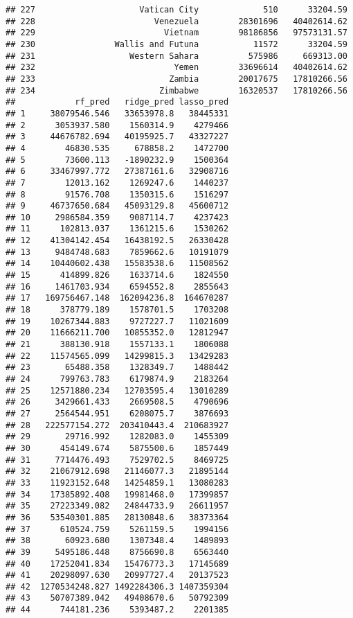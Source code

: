 \documentclass[
]{article}
\begin{document}
\begin{verbatim}
## 227                     Vatican City             510      33204.59
## 228                        Venezuela        28301696   40402614.62
## 229                          Vietnam        98186856   97573131.57
## 230                Wallis and Futuna           11572      33204.59
## 231                   Western Sahara          575986     669313.00
## 232                            Yemen        33696614   40402614.62
## 233                           Zambia        20017675   17810266.56
## 234                         Zimbabwe        16320537   17810266.56
##            rf_pred   ridge_pred lasso_pred
## 1     38079546.546   33653978.8   38445331
## 2      3053937.580    1560314.9    4279466
## 3     44676782.694   40195925.7   43327227
## 4        46830.535     678858.2    1472700
## 5        73600.113   -1890232.9    1500364
## 6     33467997.772   27387161.6   32908716
## 7        12013.162    1269247.6    1440237
## 8        91576.708    1350315.6    1516297
## 9     46737650.684   45093129.8   45600712
## 10     2986584.359    9087114.7    4237423
## 11      102813.037    1361215.6    1530262
## 12    41304142.454   16438192.5   26330428
## 13     9484748.683    7859662.6   10191079
## 14    10440602.438   15583538.6   11508562
## 15      414899.826    1633714.6    1824550
## 16     1461703.934    6594552.8    2855643
## 17   169756467.148  162094236.8  164670287
## 18      378779.189    1578701.5    1703208
## 19    10267344.883    9727227.7   11021609
## 20    11666211.700   10855352.0   12812947
## 21      388130.918    1557133.1    1806088
## 22    11574565.099   14299815.3   13429283
## 23       65488.358    1328349.7    1488442
## 24      799763.783    6179874.9    2183264
## 25    12571880.234   12703595.4   13010289
## 26     3429661.433    2669508.5    4790696
## 27     2564544.951    6208075.7    3876693
## 28   222577154.272  203410443.4  210683927
## 29       29716.992    1282083.0    1455309
## 30      454149.674    5875500.6    1857449
## 31     7714476.493    7529702.5    8469725
## 32    21067912.698   21146077.3   21895144
## 33    11923152.648   14254859.1   13080283
## 34    17385892.408   19981468.0   17399857
## 35    27223349.082   24844733.9   26611957
## 36    53540301.885   28130848.6   38373364
## 37      610524.759    5261159.5    1994156
## 38       60923.680    1307348.4    1489893
## 39     5495186.448    8756690.8    6563440
## 40    17252041.834   15476773.3   17145689
## 41    20298097.630   20997727.4   20137523
## 42  1270534248.827 1492284306.3 1407359304
## 43    50707389.042   49408670.6   50792309
## 44      744181.236    5393487.2    2201385

\end{verbatim}
\end{document}
